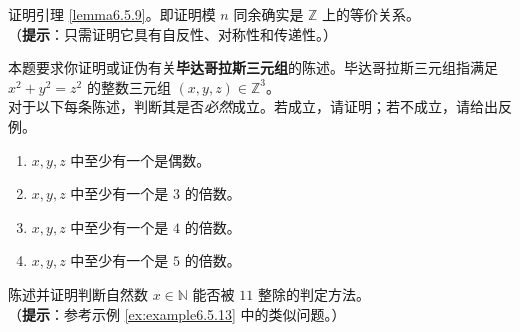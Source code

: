 \begin{exercise}\label{exc:exercises6.7.16}
    证明引理 \ref{lemma6.5.9}。即证明模 $n$ 同余确实是 $\mathbb{Z}$ 上的等价关系。\\
    （\textbf{提示}：只需证明它具有自反性、对称性和传递性。）
\end{exercise}

\begin{exercise}
    本题要求你证明或证伪有关\textbf{毕达哥拉斯三元组}的陈述。毕达哥拉斯三元组指满足 $x^2 + y^2 = z^2$ 的整数三元组 $(x, y, z) \in \mathbb{Z}^3$。\\
    对于以下每条陈述，判断其是否\emph{必然}成立。若成立，请证明；若不成立，请给出反例。
    \begin{enumerate}[label=(\alph*)]
        \item ${x,y,z}$ 中至少有一个是偶数。
        \item ${x,y,z}$ 中至少有一个是 $3$ 的倍数。
        \item ${x,y,z}$ 中至少有一个是 $4$ 的倍数。
        \item ${x,y,z}$ 中至少有一个是 $5$ 的倍数。
    \end{enumerate}
\end{exercise}

\begin{exercise}
    陈述并证明判断自然数 $x \in \mathbb{N}$ 能否被 $11$ 整除的判定方法。\\
    （\textbf{提示}：参考示例 \ref{ex:example6.5.13} 中的类似问题。）
\end{exercise}

